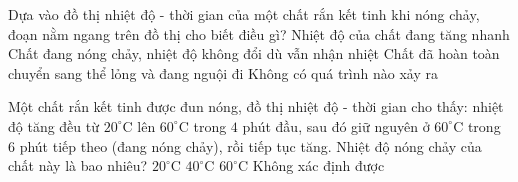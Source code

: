 \begin{ex}
	{\color{red}\footnotesize\ttfamily [L12C1B1-TN-55]}\par %
	Dựa vào đồ thị nhiệt độ - thời gian của một chất rắn kết tinh khi nóng chảy, đoạn nằm ngang trên đồ thị cho biết điều gì?
	\choice
	{Nhiệt độ của chất đang tăng nhanh}
	{\True Chất đang nóng chảy, nhiệt độ không đổi dù vẫn nhận nhiệt}
	{Chất đã hoàn toàn chuyển sang thể lỏng và đang nguội đi}
	{Không có quá trình nào xảy ra}
\end{ex}

\begin{ex}
	{\color{red}\footnotesize\ttfamily [L12C1B1-TN-56]}\par %
	Một chất rắn kết tinh được đun nóng, đồ thị nhiệt độ - thời gian cho thấy: nhiệt độ tăng đều từ $20^\circ\mathrm{C}$ lên $60^\circ\mathrm{C}$ trong $4$ phút đầu, sau đó giữ nguyên ở $60^\circ\mathrm{C}$ trong $6$ phút tiếp theo (đang nóng chảy), rồi tiếp tục tăng. Nhiệt độ nóng chảy của chất này là bao nhiêu?
	\choice
	{$20^\circ\mathrm{C}$}
	{$40^\circ\mathrm{C}$}
	{\True $60^\circ\mathrm{C}$}
	{Không xác định được}
\end{ex}

